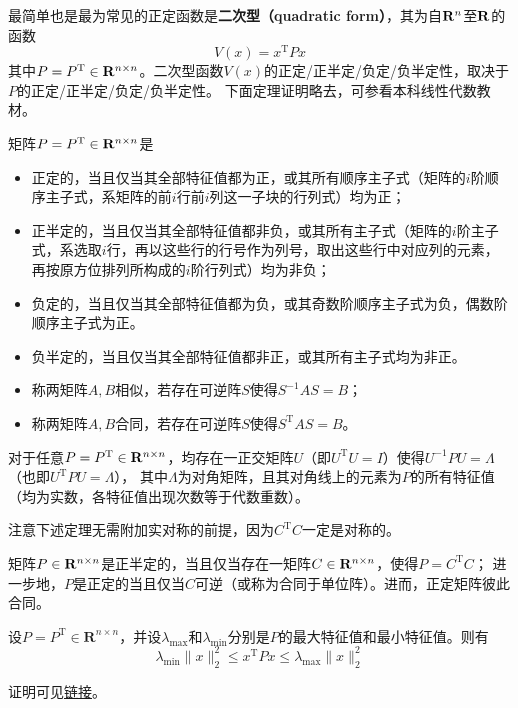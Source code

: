 最简单也是最为常见的正定函数是{\bf 二次型（quadratic form）}，其为自$\mathbf{R}{}^n$至$\mathbf{R}{}$的函数\[V(x)=x^\mathrm{T}Px\]其中$P=P^\mathrm{T}\in\mathbf{R}{}^{n\times n}$。二次型函数$V(x)$的正定/正半定/负定/负半定性，取决于$P$的正定/正半定/负定/负半定性。
下面定理证明略去，可参看本科线性代数教材。
\begin{theorem}\label{pd_nd_thm}
  矩阵$P=P^\mathrm{T}\in\mathbf{R}{}^{n\times n}$是\begin{itemize}[leftmargin=1em]
    \item 正定的，当且仅当其全部特征值都为正，或其所有顺序主子式（矩阵的$i$阶顺序主子式，系矩阵的前$i$行前$i$列这一子块的行列式）均为正；
    \item 正半定的，当且仅当其全部特征值都非负，或其所有主子式（矩阵的$i$阶主子式，系选取$i$行，再以这些行的行号作为列号，取出这些行中对应列的元素，再按原方位排列所构成的$i$阶行列式）均为非负；
    \item 负定的，当且仅当其全部特征值都为负，或其奇数阶顺序主子式为负，偶数阶顺序主子式为正。
    \item 负半定的，当且仅当其全部特征值都非正，或其所有主子式均为非正。
  \end{itemize}
\end{theorem}
\begin{definition}[相似与合同]
  \begin{itemize}[leftmargin=1em]
    \item 称两矩阵$A,B$相似，若存在可逆阵$S$使得$S^{-1}AS=B$；
    \item 称两矩阵$A,B$合同，若存在可逆阵$S$使得$S^{\mathrm{T}}AS=B$。
  \end{itemize}
\end{definition}
\begin{theorem}[实对称矩阵的正交相似对角化]\label{ortho_sim_diag}
  对于任意$P=P^\mathrm{T}\in\mathbf{R}{}^{n\times n}$，均存在一正交矩阵$U$（即$U^\mathrm{T}U=I$）使得$U^{-1}PU=\Lambda$（也即$U^{\mathrm{T}}PU=\Lambda$），
  其中$\Lambda$为对角矩阵，且其对角线上的元素为$P$的所有特征值（均为实数，各特征值出现次数等于代数重数）。
\end{theorem}
注意下述定理无需附加实对称的前提，因为$C^\mathrm{T}C$一定是对称的。
\begin{theorem}[正定、正半定矩阵的分解]\label{pd_npd_div}
  矩阵$P\in\mathbf{R}{}^{n\times n}$是正半定的，当且仅当存在一矩阵$C\in\mathbf{R}{}^{n\times n}$，使得$P=C^\mathrm{T}C$；
  进一步地，$P$是正定的当且仅当$C$可逆（或称为合同于单位阵）。进而，正定矩阵彼此合同。
\end{theorem}
\begin{theorem}\label{rayleigh-ritz}
  设$P=P^{\mathrm{T}}\in\mathbf{R}^{n\times n}$，并设$\lambda_\mathrm{max}$和$\lambda_\mathrm{min}$分别是$P$的最大特征值和最小特征值。则有
\[\lambda_{\mathrm{min}}\|x\|_{2}^{2}\le x^{\mathrm{T}}Px\le \lambda_{\mathrm{max}}\|x\|_{2}^{2}\]
\end{theorem}
证明可见\href{https://oliverwu.top/file/rayleigh-ritz.pdf}{链接}。